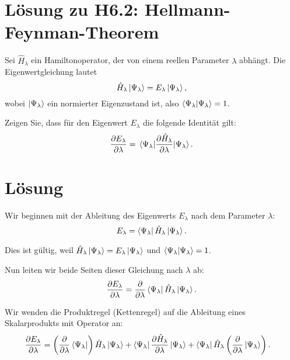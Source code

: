 \documentclass[a4paper,12pt]{scrartcl}
\begin{document}
\section*{Lösung zu H6.2: Hellmann-Feynman-Theorem}

Sei $\hat{H}_\lambda$ ein Hamiltonoperator, der von einem reellen Parameter $\lambda$ abhängt. Die Eigenwertgleichung lautet
\begin{equation}
    \hat{H}_\lambda \ket{\Psi_\lambda} = E_\lambda \ket{\Psi_\lambda},
\end{equation}
wobei $\ket{\Psi_\lambda}$ ein normierter Eigenzustand ist, also $\braket{\Psi_\lambda}{\Psi_\lambda} = 1$.

Zeigen Sie, dass für den Eigenwert $E_\lambda$ die folgende Identität gilt:
\begin{equation}
    \frac{\partial E_\lambda}{\partial \lambda} = \mel{\Psi_\lambda}{\frac{\partial \hat{H}_\lambda}{\partial \lambda}}{\Psi_\lambda}.
\end{equation}

\section*{Lösung}

Wir beginnen mit der Ableitung des Eigenwerts $E_\lambda$ nach dem Parameter $\lambda$:
\begin{equation}
    E_\lambda = \bra{\Psi_\lambda} \hat{H}_\lambda \ket{\Psi_\lambda}.
\end{equation}

Dies ist gültig, weil $\hat{H}_\lambda \ket{\Psi_\lambda} = E_\lambda \ket{\Psi_\lambda}$ und $\braket{\Psi_\lambda}{\Psi_\lambda} = 1$.

Nun leiten wir beide Seiten dieser Gleichung nach $\lambda$ ab:
\begin{equation}
    \frac{\partial E_\lambda}{\partial \lambda} = \frac{\partial}{\partial \lambda} \bra{\Psi_\lambda} \hat{H}_\lambda \ket{\Psi_\lambda}.
\end{equation}

Wir wenden die Produktregel (Kettenregel) auf die Ableitung eines Skalarprodukts mit Operator an:
\begin{align}
    \frac{\partial E_\lambda}{\partial \lambda}
    &= \left( \frac{\partial}{\partial \lambda} \bra{\Psi_\lambda} \right) \hat{H}_\lambda \ket{\Psi_\lambda}
    + \bra{\Psi_\lambda} \frac{\partial \hat{H}_\lambda}{\partial \lambda} \ket{\Psi_\lambda}
    + \bra{\Psi_\lambda} \hat{H}_\lambda \left( \frac{\partial}{\partial \lambda} \ket{\Psi_\lambda} \right).
\end{align}
\end{document}
